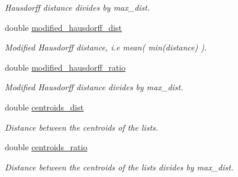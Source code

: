 \begin{DoxyCompactItemize}
\begin{DoxyCompactList}\small\item\em Hausdorff distance divides by max\-\_\-dist. \end{DoxyCompactList}\item 
\hypertarget{classofeli_1_1_hausdorff_distance_aa567ae532fb26c06648463ed3e0db0c6}{double \hyperlink{classofeli_1_1_hausdorff_distance_aa567ae532fb26c06648463ed3e0db0c6}{modified\-\_\-hausdorff\-\_\-dist}}\label{classofeli_1_1_hausdorff_distance_aa567ae532fb26c06648463ed3e0db0c6}

\begin{DoxyCompactList}\small\item\em Modified Hausdorff distance, i.\-e mean( min(distance) ). \end{DoxyCompactList}\item 
\hypertarget{classofeli_1_1_hausdorff_distance_ac7325ec0abebea6745ce9af9dbcbfe60}{double \hyperlink{classofeli_1_1_hausdorff_distance_ac7325ec0abebea6745ce9af9dbcbfe60}{modified\-\_\-hausdorff\-\_\-ratio}}\label{classofeli_1_1_hausdorff_distance_ac7325ec0abebea6745ce9af9dbcbfe60}

\begin{DoxyCompactList}\small\item\em Modified Hausdorff distance divides by max\-\_\-dist. \end{DoxyCompactList}\item 
\hypertarget{classofeli_1_1_hausdorff_distance_a6e20d6be78d947d732eefb5d207cbaab}{double \hyperlink{classofeli_1_1_hausdorff_distance_a6e20d6be78d947d732eefb5d207cbaab}{centroids\-\_\-dist}}\label{classofeli_1_1_hausdorff_distance_a6e20d6be78d947d732eefb5d207cbaab}

\begin{DoxyCompactList}\small\item\em Distance between the centroids of the lists. \end{DoxyCompactList}\item 
\hypertarget{classofeli_1_1_hausdorff_distance_ae0d112616201086a7480541b3ccaa62e}{double \hyperlink{classofeli_1_1_hausdorff_distance_ae0d112616201086a7480541b3ccaa62e}{centroids\-\_\-ratio}}\label{classofeli_1_1_hausdorff_distance_ae0d112616201086a7480541b3ccaa62e}

\begin{DoxyCompactList}\small\item\em Distance between the centroids of the lists divides by max\-\_\-dist. \end{DoxyCompactList}\end{DoxyCompactItemize}


